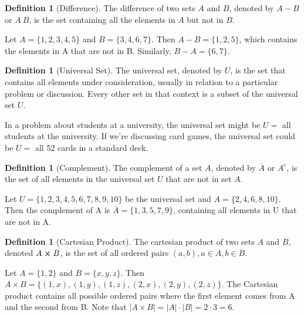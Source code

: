 \documentclass[12pt]{article}
\theoremstyle{definition}
\newtheorem{definition}[theorem]{Definition}
\begin{document}
\vspace{12pt}


\begin{definition}[Difference]
    The difference of two sets $A$ and $B$, denoted by $A - B$ or $A \ B$, is the set containing all the elements in $A$ but not in $B$.
\end{definition}


Let $A = \{1, 2, 3, 4, 5\}$ and $B = \{3, 4, 6, 7\}$. Then $A - B = \{1, 2, 5\}$, which contains the elements in A that are not in B. Similarly, $B - A = \{6, 7\}$.


\vspace{12pt}



\begin{definition}[Universal Set]
    The universal set, denoted by $U$, is the set that contains all elements under consideration, usually in relation to a particular problem or discussion. Every other set in that context is a subset of the universal set $U$.
\end{definition}

In a problem about students at a university, the universal set might be $U = $ all students at the university. If we're discussing card games, the universal set could be $U = $ all 52 cards in a standard deck.



\vspace{12pt}



\begin{definition}[Complement]
    The complement of a set $A$, denoted by $\overline{A}$ or $A^{c}$, is the set of all elements in the universal set $U$ that are not in set $A$. 
\end{definition}

Let $U = \{1, 2, 3, 4, 5, 6, 7, 8, 9, 10\}$ be the universal set and $A = \{2, 4, 6, 8, 10\}$. Then the complement of A is $\overline{A} = \{1, 3, 5, 7, 9\}$, containing all elements in U that are not in A.



\vspace{12pt}


\begin{definition}[Cartesian Product]
    The cartesian product of two sets $A$ and $B$, denoted $A \cross B$, is the set of all ordered pairs $(a, b), a \in A, b \in B$. 
\end{definition}


Let $A = \{1, 2\}$ and $B = \{x, y, z\}$. Then $A \times B = \{(1,x), (1,y), (1,z), (2,x), (2,y), (2,z)\}$. The Cartesian product contains all possible ordered pairs where the first element comes from A and the second from B. Note that $|A \times B| = |A| \cdot |B| = 2 \cdot 3 = 6$.
\end{document}
